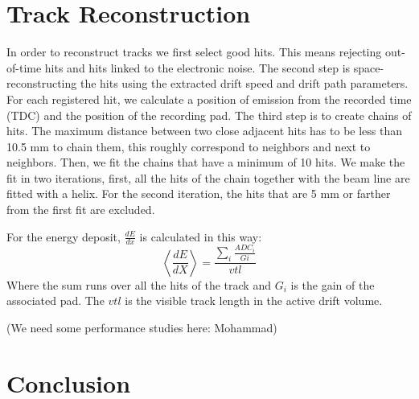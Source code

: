 \documentclass[aps,prl,twocolumn,showpacs,superscriptaddress,groupedaddress]{revtex4}
\begin{document}
\section{Track Reconstruction}\label{sec_perf}

In order to reconstruct tracks we first select good hits. This means rejecting out-of-time hits and hits linked to the electronic noise. The second step is space-reconstructing the hits using the extracted drift speed and drift path parameters. For each registered hit, we calculate a position of emission from the recorded time (TDC) and the position of the recording pad. The third step is to create chains of hits. The maximum distance between two close adjacent hits has to be less than 10.5 mm to chain them, this roughly correspond to neighbors and next to neighbors. Then, we fit the chains that have a minimum of 10 hits. We make the fit in two iterations, first, all the hits of the chain together with the beam line are fitted with a helix. For the second iteration, the hits that are 5 mm or farther from the first fit are excluded.

For the energy deposit, $\frac{dE}{dx}$ is calculated in this way:
\begin{equation}
 \left\langle \frac{dE}{dX} \right\rangle= \frac{\sum\limits_{i} \frac{ADC_{i}}{Gi}}{vtl}
\end{equation}
Where the sum runs over all the hits of the track and $G_{i}$ is the gain of the associated pad. The $vtl$ is the visible track length in the active drift volume. 

(We need some performance studies here: Mohammad)

\section{Conclusion}




  
\end{document}
